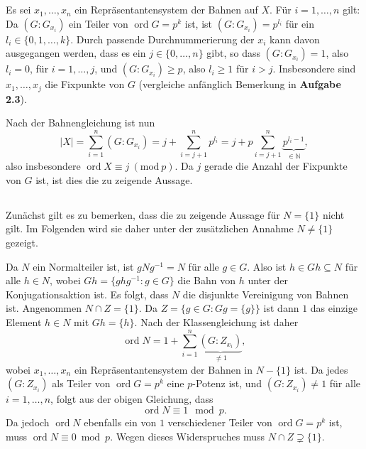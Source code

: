 \documentclass[a4paper,10pt]{article}
\theoremstyle{definition}
\newcommand{\N}{\mathbb{N}}
\newcommand{\ord}{\operatorname{ord}}
\begin{document}
\section{}

\subsection{}
Es sei $x_1, \ldots, x_n$ ein Repräsentantensystem der Bahnen auf $X$. Für $i=1,\ldots,n$ gilt: Da $(G : G_{x_i})$ ein Teiler von $\ord G = p^k$ ist, ist $(G : G_{x_i}) = p^{l_i}$ für ein $l_i \in \{0, 1, \ldots, k\}$. Durch passende Durchnummerierung der $x_i$ kann davon ausgegangen werden, dass es ein $j \in \{0,\ldots,n\}$ gibt, so dass $(G : G_{x_i}) = 1$, also $l_i = 0$, für $i=1,\ldots,j$, und $(G : G_{x_i}) \geq p$, also $l_i \geq 1$ für $i > j$. Insbesondere sind $x_1, \ldots, x_j$ die Fixpunkte von $G$ (vergleiche anfänglich Bemerkung in \textbf{Aufgabe 2.3}).

Nach der Bahnengleichung ist nun
\[
 |X|
 = \sum_{i=1}^n (G : G_{x_i})
 = j + \sum_{i=j+1}^n p^{l_i}
 = j + p \sum_{i=j+1}^n \underbrace{p^{l_i - 1}}_{\in \N},
\]
also insbesondere $\ord X \equiv j\ (\textrm{mod}\ p)$. Da $j$ gerade die Anzahl der Fixpunkte von $G$ ist, ist dies die zu zeigende Aussage.


\subsection{}
Zunächst gilt es zu bemerken, dass die zu zeigende Aussage für $N = \{1\}$ nicht gilt. Im Folgenden wird sie daher unter der zusätzlichen Annahme $N \neq \{1\}$ gezeigt.

Da $N$ ein Normalteiler ist, ist $gNg^{-1} = N$ für alle $g \in G$. Also ist $h \in Gh \subseteq N$ für alle $h \in N$, wobei $Gh = \{ghg^{-1} : g \in G\}$ die Bahn von $h$ unter der Konjugationsaktion ist. Es folgt, dass $N$ die disjunkte Vereinigung von Bahnen ist. Angenommen $N \cap Z = \{1\}$. Da $Z = \{g \in G : Gg = \{g\}\}$ ist dann $1$ das einzige Element $h \in N$ mit $Gh = \{h\}$. Nach der Klassengleichung ist daher
\[
 \ord N = 1 + \sum_{i=1}^n \underbrace{(G : Z_{x_i})}_{\neq 1},
\]
wobei $x_1, \ldots, x_n$ ein Repräsentantensystem der Bahnen in $N-\{1\}$ ist. Da jedes $(G : Z_{x_i})$ als Teiler von $\ord G = p^k$ eine $p$-Potenz ist, und $(G : Z_{x_i}) \neq 1$ für alle $i=1,\ldots, n$, folgt aus der obigen Gleichung, dass
\[
 \ord N \equiv 1 \mod p.
\]
Da jedoch $\ord N$ ebenfalls ein von $1$ verschiedener Teiler von $\ord G = p^k$ ist, muss $\ord N \equiv 0 \bmod p$. Wegen dieses Widerspruches muss $N \cap Z \supsetneq \{1\}$.
\end{document}
